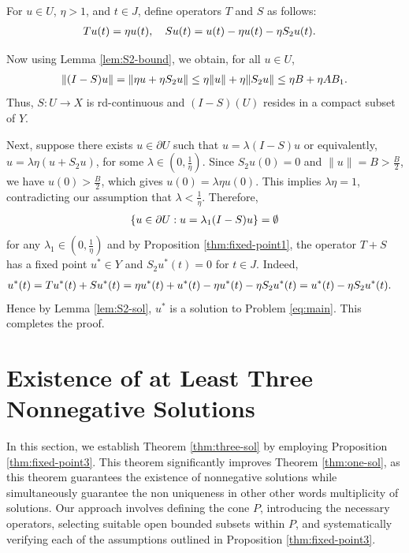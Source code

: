 \documentclass[reqno, 12pt]{amsart}
\numberwithin{equation}{section}
\begin{document}
For $u \in U$, $\eta > 1$, and $t \in J$, define operators $T$ and $S$ as follows:
\begin{align}
Tu(t) &= \eta u(t), \notag \quad
Su(t) = u(t) - \eta u(t) - \eta S_2u(t). \notag
\end{align}

Now using Lemma \ref{lem:S2-bound}, we obtain, for all $u \in U$, 
\begin{align}
\|(I - S)u\| = \|\eta u + \eta S_2u\| \leq \eta\|u\| + \eta\|S_2u\| \leq \eta B + \eta AB_1. \notag
\end{align}
Thus, $S: U \to X$ is rd-continuous and $(I - S)(U)$ resides in a compact subset of $Y$.

Next, suppose there exists $u \in \partial U$ such that $u = \lambda(I - S)u$ or equivalently, $u = \lambda\eta(u + S_2u)$, for some $\lambda \in \left(0, \frac{1}{\eta}\right)$. Since $S_2u(0) = 0$ and $\|u\| = B > \frac{B}{2}$, we have $u(0) > \frac{B}{2}$, which gives $u(0) = \lambda\eta u(0)$. This implies $\lambda\eta = 1$, contradicting our assumption that $\lambda < \frac{1}{\eta}$. Therefore,
\begin{align}
\{u \in \partial U : u = \lambda_1(I - S)u\} = \emptyset \notag
\end{align}
for any $\lambda_1 \in \left(0, \frac{1}{\eta}\right)$ and by Proposition \ref{thm:fixed-point1}, the operator $T + S$ has a fixed point $u^* \in Y$ and $S_2u^*(t) = 0$ for $t \in J$. Indeed,
\begin{align}
u^*(t) &= Tu^*(t) + Su^*(t) \notag = \eta u^*(t) + u^*(t) - \eta u^*(t) - \eta S_2u^*(t) \notag = u^*(t) - \eta S_2u^*(t). \notag
\end{align}
Hence by Lemma \ref{lem:S2-sol}, $u^*$ is a solution to Problem \eqref{eq:main}. This completes the proof.



\section{Existence of at Least Three Nonnegative Solutions}
\label{three-solutions}
In this section, we establish Theorem \ref{thm:three-sol} by employing Proposition \ref{thm:fixed-point3}. This theorem significantly improves Theorem \ref{thm:one-sol}, as this theorem guarantees the existence of nonnegative solutions while simultaneously guarantee the non uniqueness in other other words multiplicity of solutions. Our approach involves defining the cone 
$P$, introducing the necessary operators, selecting suitable open bounded subsets within 
$P$, and systematically verifying each of the assumptions outlined in Proposition \ref{thm:fixed-point3}.
\end{document}
